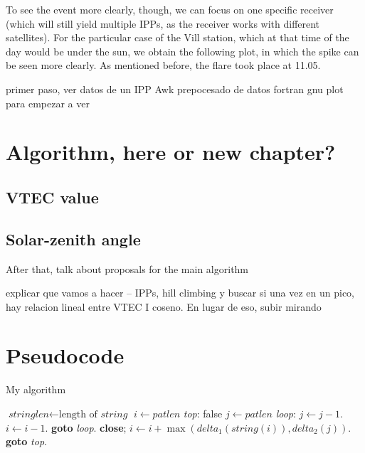 To see the event more clearly, though, we can focus on one specific receiver (which will still yield multiple IPPs, as the receiver works with different satellites). For the particular case of the Vill station, which at that time of the day would be under the sun, we obtain the following plot, in which the spike can be seen more clearly. As mentioned before, the flare took place at 11.05.


primer paso, ver datos de un IPP
Awk prepocesado de datos
fortran
gnu plot para empezar a ver



\section{Algorithm, here or new chapter?}

\subsection{VTEC value}

\subsection{Solar-zenith angle}









After that, talk about proposals for the main algorithm

explicar que vamos a hacer – IPPs, hill climbing y buscar si una vez en un pico, hay relacion lineal entre VTEC I coseno. En lugar de eso, subir mirando






\section{Pseudocode}

\begin{algorithm}
	\caption{My algorithm}\label{euclid}
	\begin{algorithmic}[1]
		\State $\textit{stringlen} \gets \text{length of }\textit{string}$
		\State $i \gets \textit{patlen}$
		\BState \emph{top}:
		 \Return false
		\EndIf
		\State $j \gets \textit{patlen}$
		\BState \emph{loop}:
		\State $j \gets j-1$.
		\State $i \gets i-1$.
		\State \textbf{goto} \emph{loop}.
		\State \textbf{close};
		\EndIf
		\State $i \gets i+\max(\textit{delta}_1(\textit{string}(i)),\textit{delta}_2(j))$.
		\State \textbf{goto} \emph{top}.
		\EndProcedure
	\end{algorithmic}
\end{algorithm}

